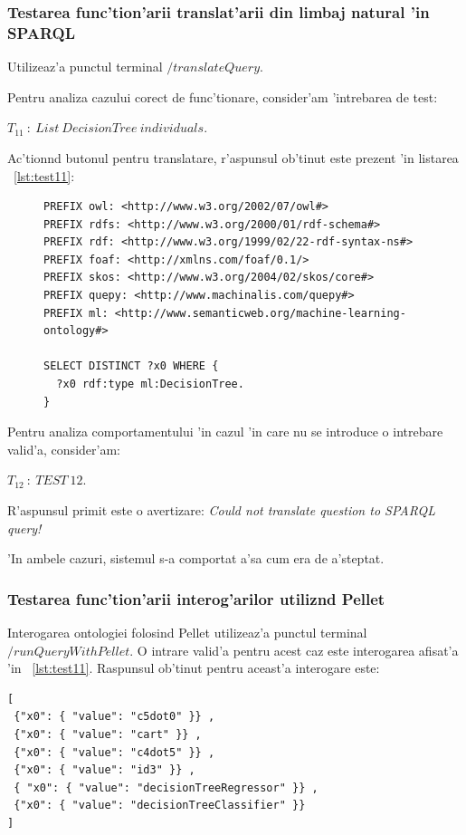 \documentclass[12pt,a4paper,twoside]{report}
\begin{document}
\subsubsection{Testarea func'tion'arii translat'arii din limbaj natural 'in SPARQL}

Utilizeaz'a punctul terminal $/translateQuery$. 

Pentru analiza cazului corect de func'tionare, consider'am 'intrebarea de test:
\begin{center}
$T_{11}\ :\ List\ DecisionTree\ individuals$.
\end{center}

Ac'tion\ia nd butonul pentru translatare, r'aspunsul ob'tinut este prezent 'in listarea ~\ref{lst:test11}:

\begin{figure}[h]
\begin{footnotesize}
\begin{lstlisting}[captionpos=b, caption=R'aspuns SPARQL pentru T_{11}, label=lst:test11,  basicstyle=\ttfamily,frame=single]
PREFIX owl: <http://www.w3.org/2002/07/owl#>
PREFIX rdfs: <http://www.w3.org/2000/01/rdf-schema#>
PREFIX rdf: <http://www.w3.org/1999/02/22-rdf-syntax-ns#>
PREFIX foaf: <http://xmlns.com/foaf/0.1/>
PREFIX skos: <http://www.w3.org/2004/02/skos/core#>
PREFIX quepy: <http://www.machinalis.com/quepy#>
PREFIX ml: <http://www.semanticweb.org/machine-learning-ontology#>

SELECT DISTINCT ?x0 WHERE {
  ?x0 rdf:type ml:DecisionTree.
}
\end{lstlisting}
\end{footnotesize}
\end{figure}

Pentru analiza comportamentului 'in cazul 'in care nu se introduce o intrebare valid'a, consider'am:
\begin{center}
$T_{12}\ :\ TEST\ 12$.
\end{center}

R'aspunsul primit este o avertizare: {\it Could not translate question to SPARQL query!}

'In ambele cazuri, sistemul s-a comportat a'sa cum era de a'steptat.

\subsubsection{Testarea func'tion'arii interog'arilor utiliz\ia nd Pellet}

Interogarea ontologiei folosind Pellet utilizeaz'a punctul terminal $/runQueryWithPellet$.
O intrare valid'a pentru acest caz este interogarea afisat'a 'in ~\ref{lst:test11}. Raspunsul ob'tinut pentru aceast'a interogare este:
\begin{lstlisting}[basicstyle=\footnotesize]
[
 {"x0": { "value": "c5dot0" }} ,
 {"x0": { "value": "cart" }} ,
 {"x0": { "value": "c4dot5" }} ,
 {"x0": { "value": "id3" }} ,
 { "x0": { "value": "decisionTreeRegressor" }} ,
 {"x0": { "value": "decisionTreeClassifier" }}
]
\end{lstlisting}
\end{document}
